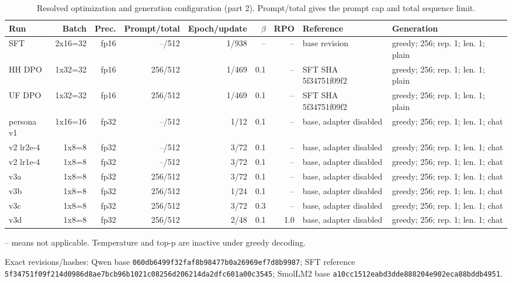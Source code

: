 \begin{table}[H]\centering\footnotesize\caption{Resolved optimization and generation configuration (part 2). Prompt/total gives the prompt cap and total sequence limit.}\label{tab:config-b}
\setlength{\tabcolsep}{2pt}\begin{tabularx}{\textwidth}{lrrrrrr>{\raggedright\arraybackslash}p{2.1cm}X}\toprule Run&Batch&Prec.&Prompt/total&Epoch/update&$\beta$&RPO&Reference&Generation\\\midrule
SFT & 2x16=32 & fp16 & --/512 & 1/938 & -- & -- & base revision & greedy; 256; rep. 1; len. 1; plain\\
HH DPO & 1x32=32 & fp16 & 256/512 & 1/469 & 0.1 & -- & SFT SHA 5f34751f09f2 & greedy; 256; rep. 1; len. 1; plain\\
UF DPO & 1x32=32 & fp16 & 256/512 & 1/469 & 0.1 & -- & SFT SHA 5f34751f09f2 & greedy; 256; rep. 1; len. 1; plain\\
persona v1 & 1x16=16 & fp32 & --/512 & 1/12 & 0.1 & -- & base, adapter disabled & greedy; 256; rep. 1; len. 1; chat\\
v2 lr2e-4 & 1x8=8 & fp32 & --/512 & 3/72 & 0.1 & -- & base, adapter disabled & greedy; 256; rep. 1; len. 1; chat\\
v2 lr1e-4 & 1x8=8 & fp32 & --/512 & 3/72 & 0.1 & -- & base, adapter disabled & greedy; 256; rep. 1; len. 1; chat\\
v3a & 1x8=8 & fp32 & 256/512 & 3/72 & 0.1 & -- & base, adapter disabled & greedy; 256; rep. 1; len. 1; chat\\
v3b & 1x8=8 & fp32 & 256/512 & 1/24 & 0.1 & -- & base, adapter disabled & greedy; 256; rep. 1; len. 1; chat\\
v3c & 1x8=8 & fp32 & 256/512 & 3/72 & 0.3 & -- & base, adapter disabled & greedy; 256; rep. 1; len. 1; chat\\
v3d & 1x8=8 & fp32 & 256/512 & 2/48 & 0.1 & 1.0 & base, adapter disabled & greedy; 256; rep. 1; len. 1; chat\\
\bottomrule\end{tabularx}\par\footnotesize -- means not applicable. Temperature and top-p are inactive under greedy decoding.\par\scriptsize Exact revisions/hashes: Qwen base \texttt{060db6499f32faf8b98477b0a26969ef7d8b9987}; SFT reference \texttt{5f34751f09f214d0986d8ae7bcb96b1021c08256d206214da2dfc601a00c3545}; SmolLM2 base \texttt{a10cc1512eabd3dde888204e902eca88bddb4951}.\end{table}

